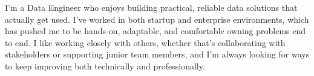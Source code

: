 

\begin{cvparagraph}

I’m a Data Engineer who enjoys building practical, reliable data solutions that actually get used. I’ve worked in both startup and enterprise environments, which has pushed me to be hands-on, adaptable, and comfortable owning problems end to end. I like working closely with others, whether that’s collaborating with stakeholders or supporting junior team members, and I’m always looking for ways to keep improving both technically and professionally.
\end{cvparagraph}
